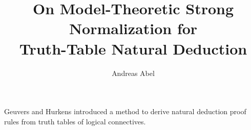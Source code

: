 \documentclass[a4paper]{easychair}
\begin{document}
\title{On Model-Theoretic Strong Normalization for \\ Truth-Table Natural Deduction}
\author{Andreas Abel}%


\maketitle


\noindent


\newcommand{\wraptt}{%
\begin{wrapfigure}[7]{r}[0pt]{0pt}%
\(\begin{array}{cc|c}
  A & B & A \to B \\
\hline
  0 & 0 & 1 \\
  0 & 1 & 1 \\
  1 & 0 & 0 \\
  1 & 1 & 1 \\
\end{array}\)%
\end{wrapfigure}%
}

Geuvers and Hurkens \citeyearpar{geuversHurkens:icla17} introduced a method to derive natural
deduction proof rules from truth tables of logical connectives.
\end{document}
